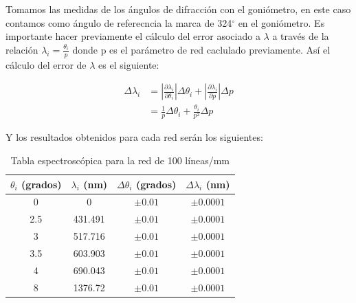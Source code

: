\documentclass[11pt, a4paper, twocolumn]{article}
\begin{document}
Tomamos las medidas de los ángulos de difracción con el goniómetro, en este caso contamos como ángulo de referecncia la marca de 324$^\circ$ en el goniómetro. 
Es importante hacer previamente el cálculo del error asociado a $\lambda$ a través de la relación $\lambda_{i} = \frac{\theta_{i}}{p}$ donde p es el parámetro de red caclulado previamente. 
Así el cálculo del error de $\lambda$ es el siguiente:

\begin{align}
    \Delta \lambda_{i} & = \left|\frac{\partial \lambda_{i}}{\partial \theta_{i}}\right|\Delta \theta_{i} + \left|\frac{\partial \lambda_{i}}{\partial p}\right|\Delta p \\
    & = \frac{1}{p} \Delta \theta_{i} + \frac{\theta_{i}}{p^2} \Delta p
\end{align}

Y los resultados obtenidos para cada red serán los siguientes:

\begin{table}[H]
    \caption{Tabla espectroscópica para la red de 100 líneas/mm}
    \centering
    \small
    \setlength{\tabcolsep}{4pt}
    \begin{tabular}{cccc}
        \hline
        $\theta_{i}$ (grados) &   $\lambda_{i}$ (nm) &   $\Delta \theta_{i}$ (grados) & $\Delta \lambda_{i}$ (nm)   \\
        \hline
                    0   &          0     &                     $\pm 0.01$ & $ \pm 0.0001$            \\
                    2.5 &        431.491 &                     $\pm 0.01$ & $ \pm 0.0001$            \\
                    3   &        517.716 &                     $\pm 0.01$ & $ \pm 0.0001$            \\
                    3.5 &        603.903 &                     $\pm 0.01$ & $ \pm 0.0001$            \\
                    4   &        690.043 &                     $\pm 0.01$ & $ \pm 0.0001$            \\
                    8   &       1376.72  &                     $\pm 0.01$ & $ \pm 0.0001$            \\
        \hline
    \end{tabular}
\end{table}
\end{document}
